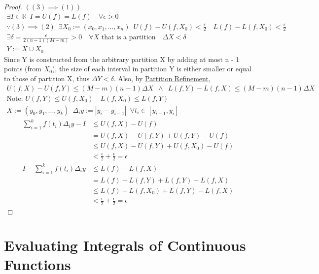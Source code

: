 \documentclass[11pt, oneside]{book}
\theoremstyle{break}
\newtheorem*{proof}{Proof}
\newcommand{\bb}[1]{\mathbb{#1}}			%
\begin{document}
\begin{proof}
	$((3) \implies (1))$
	\begin{gather*}
		\exists I \in \bb{R} \enspace I = U(f) = L(f) \quad \forall \epsilon > 0 \\
		\because (3) \implies (2) \enspace \exists X_0 := (x_0, x_1, ..., x_n) \enspace U(f) - U(f, X_0) < \frac{\epsilon}{2} \quad L(f) - L(f, X_0) < \frac{\epsilon}{2} \\
		\exists \delta = \frac{\epsilon}{2(n-1)(M - m)} > 0 \quad \forall X \text{ that is a partition} \quad \Delta X < \delta \\
		Y := X \cup X_0
	\end{gather*}
	Since Y is constructed from the arbitrary partition X by adding at most n - 1 points (from $X_0$), the size of each interval in partition Y is either smaller or equal to those of partition X, thus $\Delta Y < \delta$. Also, by \hyperref[partition_refinement]{Partition Refinement},
	\begin{gather*}
		U(f, X) - U(f, Y) \leq (M - m)(n - 1) \Delta X \enspace \land \enspace L(f, Y) - L(f, X) \leq (M - m)(n - 1) \Delta X \\
		\text{Note: } U(f, Y) \leq U(f, X_0) \quad L(f, X_0) \leq L(f, Y) \\
		X := (y_0, y_1, ..., y_k) \enspace \Delta_i y := |y_i - y_{i-1} | \enspace \forall t_i \in [y_{i-1}, y_i]
	\end{gather*}
	\begin{align*}
		\sum_{i=1}^{k} f(t_i) \Delta_i y - I &\leq U(f, X) - U(f) \\
											 &= U(f, X) - U(f, Y) + U(f, Y) - U(f) \\
											 &\leq U(f, X) - U(f, Y) + U(f, X_0) - U(f) \\
											 &< \frac{\epsilon}{2} + \frac{\epsilon}{2} = \epsilon \\
		I - \sum_{i=1}^{k} f(t_i) \Delta_i y &\leq L(f) - L(f, X) \\
											 &= L(f) - L(f, Y) + L(f, Y) - L(f, X) \\
											 &\leq L(f) - L(f, X_0) + L(f, Y) - L(f, X) \\
											 &< \frac{\epsilon}{2} + \frac{\epsilon}{2} = \epsilon
	\end{align*}
\end{proof}


\section{Evaluating Integrals of Continuous Functions}
\end{document}
